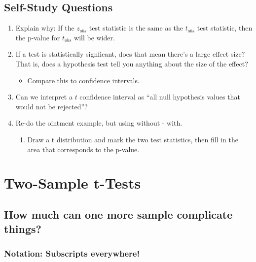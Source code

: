 \documentclass[
  letterpaper,
  DIV=11,
  numbers=noendperiod]{scrreprt}
\providecommand{\tightlist}{%
  \setlength{\itemsep}{0pt}\setlength{\parskip}{0pt}}\usepackage{longtable,booktabs,array}
\begin{document}
\hypertarget{self-study-questions-5}{%
\section{Self-Study Questions}\label{self-study-questions-5}}

\begin{enumerate}
\def\labelenumi{\arabic{enumi}.}
\tightlist
\item
  Explain why: If the \(z_{obs}\) test statistic is the same as the
  \(t_{obs}\) test statistic, then the p-value for \(t_{obs}\) will be
  wider.
\item
  If a test is statistically signficant, does that mean there's a large
  effect size? That is, does a hypothesis test tell you anything about
  the size of the effect?

  \begin{itemize}
  \tightlist
  \item
    Compare this to confidence intervals.
  \end{itemize}
\item
  Can we interpret a \(t\) confidence interval as ``all null hypothesis
  values that would not be rejected''?
\item
  Re-do the ointment example, but using without - with.

  \begin{enumerate}
  \def\labelenumii{\alph{enumii}.}
  \tightlist
  \item
    Draw a t distribution and mark the two test statistics, then fill in
    the area that corresponds to the p-value.
  \end{enumerate}
\end{enumerate}

\hypertarget{two-sample-t-tests}{%
\chapter{Two-Sample t-Tests}\label{two-sample-t-tests}}

\hypertarget{how-much-can-one-more-sample-complicate-things}{%
\section{How much can one more sample complicate
things?}\label{how-much-can-one-more-sample-complicate-things}}

\hypertarget{notation-subscripts-everywhere}{%
\subsection{Notation: Subscripts
everywhere!}\label{notation-subscripts-everywhere}}
\end{document}
